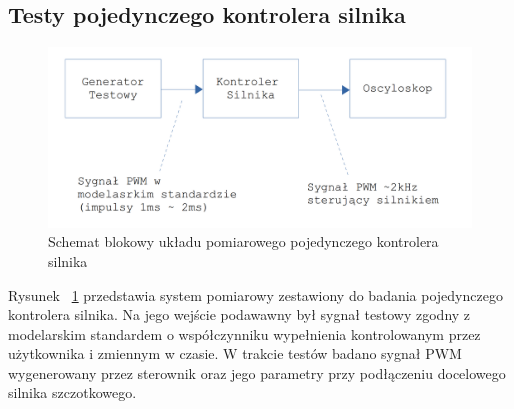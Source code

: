 \subsection{Testy pojedynczego kontrolera silnika}

\begin{figure}[H]
	\centering
	\includegraphics[scale=0.2]{Pictures/TestyKontroleraSilnikow.png}
	\caption[Schemat blokowy układu pomiarowego pojedynczego kontrolera silnika]{Schemat blokowy układu pomiarowego pojedynczego kontrolera silnika}
	\label{fig:MotorController_test_single}
\end{figure}

Rysunek ~\ref{fig:MotorController_test_single} przedstawia system pomiarowy zestawiony do badania pojedynczego kontrolera silnika. Na jego wejście podawawny był sygnał testowy zgodny z modelarskim standardem o współczynniku wypełnienia kontrolowanym przez użytkownika i zmiennym w czasie. W trakcie testów badano sygnał PWM wygenerowany przez sterownik oraz jego parametry przy podłączeniu docelowego silnika szczotkowego.


